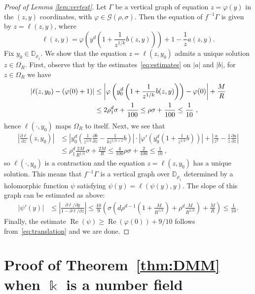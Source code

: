 \documentclass[11 pt, oneside, a4paper]{amsart}
\newcommand{\D}{\mathbb{D}}
\newcommand{\cG}{\mathcal{G}}
\newcommand{\abs}[1]{{\left|{#1}\right|}}
\newcommand{\on}[1]{\operatorname{#1}}
\renewcommand{\Re}{\on{Re}}
\newcommand{\nk}{\Bbbk}
\newcommand{\fr}{\partial}
\newcommand{\unsur}[1]{\frac{1}{#1}}
\newcommand{\lrpar}[1]{\left(#1\right)}
\newcommand{\inv}{^{-1}}
\theoremstyle{definition}
\theoremstyle{definition}
\begin{document}
\begin{proof}[Proof of Lemma \ref{lem:vertest}]
Let $\Gamma$ be a vertical graph of equation $z=\varphi(y)$ in the $(z,y)$ coordinates, 
with $\varphi\in  \cG(\rho, \sigma)$. Then 
the equation of  $f\inv \Gamma$ is given by  $z= \ell(z,y)$, where 
\[ \ell(z,y) =  \varphi\lrpar{y^d \lrpar{1+  \unsur{z^{1/k}} b(z,y)}} +1  -  \unsur{z} a(z,y). \] 
Fix $y_0\in \D_{\rho_1}$. We 
  show that the equation $ z = \ell(z,y_0)$ admits a unique solution $z\in \Omega_R$. First, observe that by the 
  estimates~\eqref{eq:estimates} on $\abs{a}$ and $\abs{b}$, for $z\in \Omega_R$  we have   
\begin{align}
\label{eq:translation}\abs{\ell(z, y_0 )  - (\varphi(0)+1)}&\leq \abs{\varphi\lrpar{y_0^d \lrpar{1+  \unsur{z^{1/k}} b(z,y)}}  - \varphi(0)} + \frac{M}{R}
\\ \notag& \leq 2 \rho_1^d  \sigma +\frac{1}{100} \leq \rho  \sigma+\frac{1}{100} \leq 
 \unsur{10}\ ,
 \end{align}
hence  $\ell(\cdot, y_0)$ maps   $\Omega_R$ to itself. Next, we see that 
\begin{align*} \abs{\frac{\fr \ell}{\fr z}(z,y_0)} 
 &\leq \abs{y_0^d\lrpar{\unsur{z^{1/k}}  {\frac{\fr b}{\fr z}} - \frac{1}{kz^{1/k+1}}b}} \cdot \abs{\varphi' \lrpar{y_0^d \lrpar{1+  \unsur{z^{1/k}} b}}} + \abs{\frac{a}{z^2}- \unsur{z} {\frac{\fr a}{\fr z}}}\\
 &\leq \rho_1^d \frac{2M}{R^{1/k}}  \sigma +  \frac{2M}{R}\leq \frac{4}{100}\rho  \sigma + \frac{2}{100}\leq \frac{1}{10}\ ,
 \end{align*}
so $\ell(\cdot, y_0)$ is a contraction and the equation 
  $z = \ell(z, y_0)$ has a unique solution. This means that $f\inv\Gamma$ is a vertical graph over $\D_{\rho_1}$ determined by a holomorphic
  function $\psi$ satisfying $\psi(y) = \ell(\psi(y),y)$. 
  The slope of this graph can  be estimated as above: 
 \begin{align*} 
 \abs{\psi'(y)} 
 & \leq \abs{\frac{ {\fr\ell}/{ \fr y} }{1 -  {\fr\ell}/{ \fr z}}}
\le \frac{10}{9}  \left(  
\sigma \left(d \rho^{d-1} \left(1+\frac{M}{R^{1/k}}\right) + \rho^d \frac{M}{R^{1/k}}\right)
+ \frac{M}R\right) \le \frac1{10}.
 \end{align*}  
 Finally, the estimate $\Re(\psi) \geq \Re(\varphi(0)) + 9/10$ follows from~\eqref{eq:translation} and we are done. 
\end{proof}


\section{Proof of Theorem~\ref{thm:DMM} when $\nk$ is a number field}\label{sec:conclusion_number_field}
\end{document}
